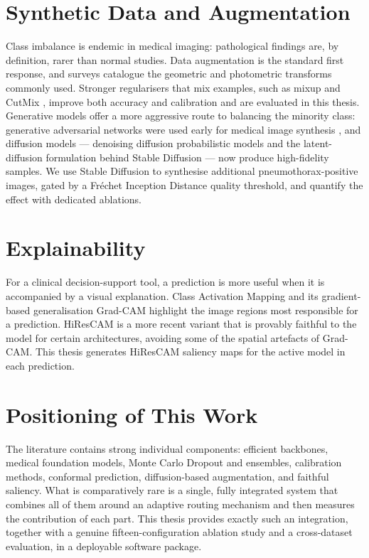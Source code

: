 \section{Synthetic Data and Augmentation}
Class imbalance is endemic in medical imaging: pathological findings are, by definition, rarer than normal studies. Data augmentation is the standard first response, and surveys \cite{shorten2019survey} catalogue the geometric and photometric transforms commonly used. Stronger regularisers that mix examples, such as mixup \cite{zhang2018mixup} and CutMix \cite{yun2019cutmix}, improve both accuracy and calibration and are evaluated in this thesis. Generative models offer a more aggressive route to balancing the minority class: generative adversarial networks were used early for medical image synthesis \cite{goodfellow2014generative, fridadar2018gan}, and diffusion models --- denoising diffusion probabilistic models \cite{ho2020denoising} and the latent-diffusion formulation behind Stable Diffusion \cite{rombach2022high} --- now produce high-fidelity samples. We use Stable Diffusion to synthesise additional pneumothorax-positive images, gated by a Fr\'echet Inception Distance quality threshold, and quantify the effect with dedicated ablations.

\section{Explainability}
For a clinical decision-support tool, a prediction is more useful when it is accompanied by a visual explanation. Class Activation Mapping \cite{zhou2016learning} and its gradient-based generalisation Grad-CAM \cite{selvaraju2017gradcam} highlight the image regions most responsible for a prediction. HiResCAM \cite{draelos2020hirescam} is a more recent variant that is provably faithful to the model for certain architectures, avoiding some of the spatial artefacts of Grad-CAM. This thesis generates HiResCAM saliency maps for the active model in each prediction.

\section{Positioning of This Work}
The literature contains strong individual components: efficient backbones, medical foundation models, Monte Carlo Dropout and ensembles, calibration methods, conformal prediction, diffusion-based augmentation, and faithful saliency. What is comparatively rare is a single, fully integrated system that combines all of them around an adaptive routing mechanism and then measures the contribution of each part. This thesis provides exactly such an integration, together with a genuine fifteen-configuration ablation study and a cross-dataset evaluation, in a deployable software package.
